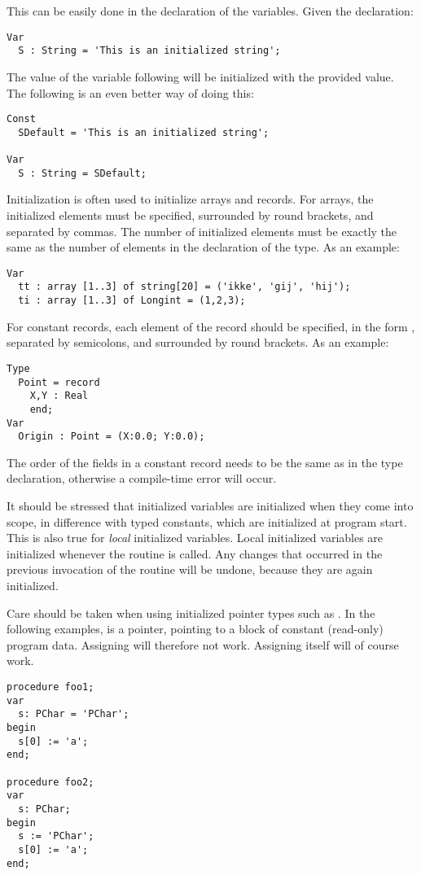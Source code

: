 This can be easily done in the declaration of the variables. 
Given the declaration:
\begin{verbatim}
Var
  S : String = 'This is an initialized string';
\end{verbatim}
The value of the variable following will be initialized with the provided
value. The following is an even better way of doing this:
\begin{verbatim}
Const
  SDefault = 'This is an initialized string';

Var
  S : String = SDefault;
\end{verbatim}
Initialization is often used to initialize arrays and records. For arrays,
the initialized elements must be specified, surrounded by round brackets, and
separated by commas. The number of initialized elements must be exactly the 
same as the number of elements in the declaration of the type.
As an example:
\begin{verbatim}
Var
  tt : array [1..3] of string[20] = ('ikke', 'gij', 'hij');
  ti : array [1..3] of Longint = (1,2,3);
\end{verbatim}
For constant records, each element of the record should be specified, in
the form , separated by semicolons, and surrounded by round
brackets.
As an example:
\begin{verbatim}
Type
  Point = record
    X,Y : Real
    end;
Var
  Origin : Point = (X:0.0; Y:0.0);
\end{verbatim}
The order of the fields in a constant record needs to be the same as in the type 
declaration, otherwise a compile-time error will occur.

\begin{remark}
It should be stressed that initialized variables are initialized when they
come into scope, in difference with typed constants, which are initialized 
at program start.
This is also true for {\em local} initialized variables. Local initialized
variables are initialized whenever the routine is called. Any changes that
occurred in the previous invocation of the routine will be undone, because
they are again initialized.
\end{remark}

\begin{remark}
Care should be taken when using initialized pointer types such as . 
In the following examples,  is a pointer, pointing to a block of constant
(read-only) program data.
Assigning  will therefore not work. Assigning  itself will
of course work.
\begin{verbatim}
procedure foo1;
var
  s: PChar = 'PChar';
begin
  s[0] := 'a';
end;
 
procedure foo2;
var
  s: PChar;
begin
  s := 'PChar';
  s[0] := 'a';
end;
\end{verbatim}
\end{remark}

